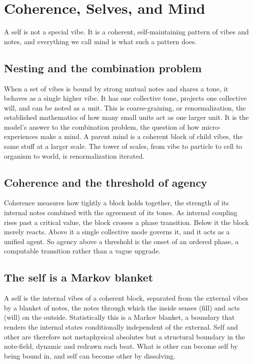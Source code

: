 \section{Coherence, Selves, and Mind}
\label{sec:mind}

A self is not a special vibe. It is a coherent, self-maintaining pattern of vibes and notes, and everything we call mind is what such a pattern does.

\subsection{Nesting and the combination problem}

When a set of vibes is bound by strong mutual notes and shares a tone, it behaves as a single higher vibe. It has one collective tone, projects one collective will, and can be noted as a unit. This is coarse-graining, or renormalization, the established mathematics of how many small units act as one larger unit. It is the model's answer to the combination problem, the question of how micro-experiences make a mind. A parent mind is a coherent block of child vibes, the same stuff at a larger scale. The tower of scales, from vibe to particle to cell to organism to world, is renormalization iterated.

\subsection{Coherence and the threshold of agency}

Coherence measures how tightly a block holds together, the strength of its internal notes combined with the agreement of its tones. As internal coupling rises past a critical value, the block crosses a phase transition. Below it the block merely reacts. Above it a single collective mode governs it, and it acts as a unified agent. So agency above a threshold is the onset of an ordered phase, a computable transition rather than a vague upgrade.

\subsection{The self is a Markov blanket}

A self is the internal vibes of a coherent block, separated from the external vibes by a blanket of notes, the notes through which the inside senses (fill) and acts (will) on the outside. Statistically this is a Markov blanket, a boundary that renders the internal states conditionally independent of the external. Self and other are therefore not metaphysical absolutes but a structural boundary in the note-field, dynamic and redrawn each beat. What is other can become self by being bound in, and self can become other by dissolving.

